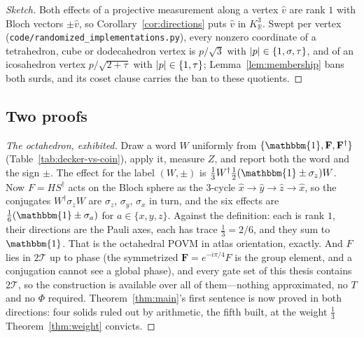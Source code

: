 \documentclass[11pt, oneside, openany]{scrbook}
\DeclareMathOperator{\Tr}{Tr}
\newcommand{\R}{\mathbb{R}}
\newcommand{\Id}{\mathbbm{1}}
\newcommand{\sigmaz}{\sigma_z}
\newcommand{\Tgroup}{\mathcal{T}}  %
\newcommand{\TwoT}{2\Tgroup}
\newcommand{\phig}{\tau} %
\newcommand{\invphig}{\sigma} %
\newenvironment{sketch}{\renewcommand{\qedsymbol}{}\begin{proof}[Sketch]}{\end{proof}}
\DeclarePairedDelimiter{\abs}{\lvert}{\rvert}
\begin{document}
\begin{sketch}
Both effects of a projective measurement along a vertex $\hat v$ are rank $1$ with Bloch vectors $\pm\hat v$, so Corollary~\ref{cor:directions} puts $\hat v$ in $K_\R^3$. Swept per vertex (\texttt{code/randomized\_implementations.py}), every nonzero coordinate of a tetrahedron, cube or dodecahedron vertex is $p/\sqrt{3}$ with $\abs{p} \in \{1, \invphig, \phig\}$, and of an icosahedron vertex $p/\sqrt{2+\phig}$ with $\abs{p} \in \{1, \phig\}$; Lemma~\ref{lem:membership} bans both surds, and its coset clause carries the ban to these quotients.
\end{sketch}

\subsection{Two proofs} \label{sec:decker:exactness:expanded}


\begin{proof}[The octahedron, exhibited]
Draw a word $W$ uniformly from $\{\Id, \mathbf{F}, \mathbf{F}^\dagger\}$ (Table~\ref{tab:decker-vs-coin}), apply it, measure $Z$, and report both the word and the sign $\pm$. The effect for the label $(W, \pm)$ is $\tfrac{1}{3}W^\dagger\tfrac{1}{2}(\Id \pm \sigmaz)W$. Now $F = HS^\dagger$ acts on the Bloch sphere as the $3$-cycle $\hat x \to \hat y \to \hat z \to \hat x$, so the conjugates $W^\dagger\sigmaz W$ are $\sigmaz$, $\sigma_y$, $\sigma_x$ in turn, and the six effects are $\tfrac{1}{6}(\Id \pm \sigma_a)$ for $a \in \{x, y, z\}$. Against the definition: each is rank $1$, their directions are the Pauli axes, each has trace $\tfrac{1}{3} = 2/6$, and they sum to $\Id$. That is the octahedral POVM in atlas orientation, exactly. And $F$ lies in $\TwoT$ up to phase (the symmetrized $\mathbf{F} = e^{-i\pi/4}F$ is the group element, and a conjugation cannot see a global phase), and every gate set of this thesis contains $\TwoT$, so the construction is available over all of them---nothing approximated, no $T$ and no $\Phi$ required. Theorem~\ref{thm:main}'s first sentence is now proved in both directions: four solids ruled out by arithmetic, the fifth built, at the weight $\tfrac13$ Theorem~\ref{thm:weight} convicts.
\end{proof}
\end{document}
